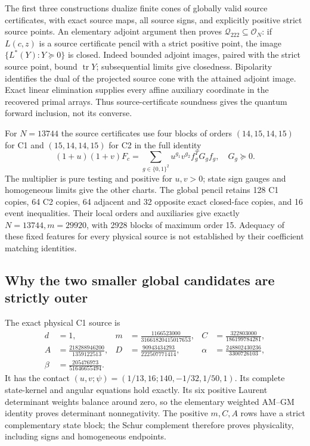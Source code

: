 \documentclass[11pt]{article}
\newcommand{\Q}{\mathcal Q_{222}}
\begin{document}
The first three constructions dualize finite cones of globally valid
source certificates, with exact source maps, all source signs, and
explicitly positive strict source points. An elementary adjoint argument
then proves $\Q\subseteq\mathcal O_N$: if $L(c,z)$ is a source
certificate pencil with a strict positive point, the image
$\{L^*(Y):Y\succeq0\}$ is closed. Indeed bounded adjoint images,
paired with the strict source point, bound $\operatorname{tr}Y$;
subsequential limits give closedness. Bipolarity identifies the dual of
the projected source cone with the attained adjoint image. Exact linear
elimination supplies every affine auxiliary coordinate in the recovered
primal arrays. Thus source-certificate soundness gives the quantum
forward inclusion, not its converse.

For $N=13744$ the source certificates use four blocks of orders
$(14,15,14,15)$ for C1 and $(15,14,14,15)$ for C2 in the full identity
\[
 (1+u)(1+v)F_c=\sum_{g\in\{0,1\}^2}u^{g_1}v^{g_2}
                                       f_g^TG_gf_g,\quad G_g\succeq0.
\]
The multiplier is pure testing and positive for $u,v>0$; state sign
gauges and homogeneous limits give the other charts. The global pencil
retains 128 C1 copies, 64 C2 copies, 64 adjacent and 32 opposite exact
closed-face copies, and 16 event inequalities. Their local orders and
auxiliaries give exactly $N=13744,m=29920$, with 2928 blocks of maximum
order 15. Adequacy of these fixed features for every physical source is
not established by their coefficient matching identities.

\subsection{Why the two smaller global candidates are strictly outer}

The exact physical C1 source is
\[
 \begin{aligned}
 d&=1,&m&=\frac{1166523000}{31661820415017653},&
 C&=\frac{322803000}{186199784281},\\
 A&=\frac{218288946200}{1359122513},&
 D&=\frac{90943434293}{222507771414},&
 \alpha&=\frac{248802430236}{3300726103},\\
 \beta&=\frac{205476973}{51646655494}.&&&&
 \end{aligned}
\]
It has the contact $(u,v;\psi)=(1/13,16;140,-1/32,1/50,1)$.
Its complete state-kernel and angular equations hold exactly. Its six
positive Laurent determinant weights balance around zero, so the
elementary weighted AM--GM identity proves determinant nonnegativity.
The positive $m,C,A$ rows have a strict complementary state block;
the Schur complement therefore proves physicality, including signs
and homogeneous endpoints.
\end{document}
